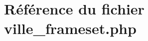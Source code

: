 \hypertarget{ville__frameset_8php}{
\section{R\'{e}f\'{e}rence du fichier ville\_\-frameset.php}
\label{ville__frameset_8php}
}
